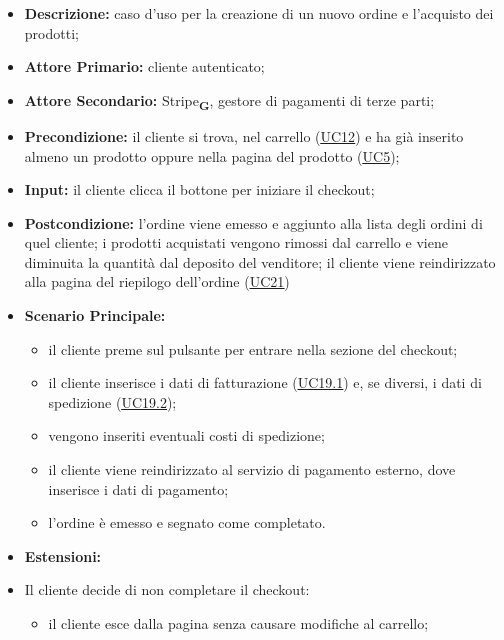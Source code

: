 \begin{itemize}
    \item \textbf{Descrizione:} caso d'uso per la creazione di un nuovo ordine e l'acquisto dei prodotti;
    \item \textbf{Attore Primario:} cliente autenticato;
    \item \textbf{Attore Secondario:} Stripe\textsubscript{\textbf{G}}, gestore di pagamenti di terze parti;
    \item \textbf{Precondizione:} il cliente si trova, nel carrello (\hyperref[sec:UC12]{\underline{UC12}}) e ha già inserito almeno un prodotto oppure nella pagina del prodotto (\hyperref[sec:UC5]{\underline{UC5}});
    \item \textbf{Input:} il cliente clicca il bottone per iniziare il checkout;
    \item \textbf{Postcondizione:} l'ordine viene emesso e aggiunto alla lista degli ordini di quel cliente; i prodotti acquistati vengono rimossi dal carrello e viene diminuita la quantità dal deposito del venditore; il cliente viene reindirizzato alla pagina del riepilogo dell'ordine (\hyperref[sec:UC21]{\underline{UC21}})
    \item \textbf{Scenario Principale:}
          \begin{itemize}
              \item il cliente preme sul pulsante per entrare nella sezione del checkout;
              \item il cliente inserisce i dati di fatturazione (\hyperref[sec:UC19.1]{\underline{UC19.1}}) e, se diversi, i dati di spedizione (\hyperref[sec:UC19.2]{\underline{UC19.2}});
              \item vengono inseriti eventuali costi di spedizione;
              \item il cliente viene reindirizzato al servizio di pagamento esterno, dove inserisce i dati di pagamento;
              \item l'ordine è emesso e segnato come completato.
          \end{itemize}
    \item \textbf{Estensioni:}
    \item Il cliente decide di non completare il checkout:
          \begin{itemize}
              \item  il cliente esce dalla pagina senza causare modifiche al carrello;
          \end{itemize}
\end{itemize}
